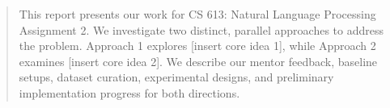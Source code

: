 \begin{abstract}
This report presents our work for CS 613: Natural Language Processing Assignment 2. We investigate two distinct, parallel approaches to address the problem. Approach 1 explores [insert core idea 1], while Approach 2 examines [insert core idea 2]. We describe our mentor feedback, baseline setups, dataset curation, experimental designs, and preliminary implementation progress for both directions.
\end{abstract}
